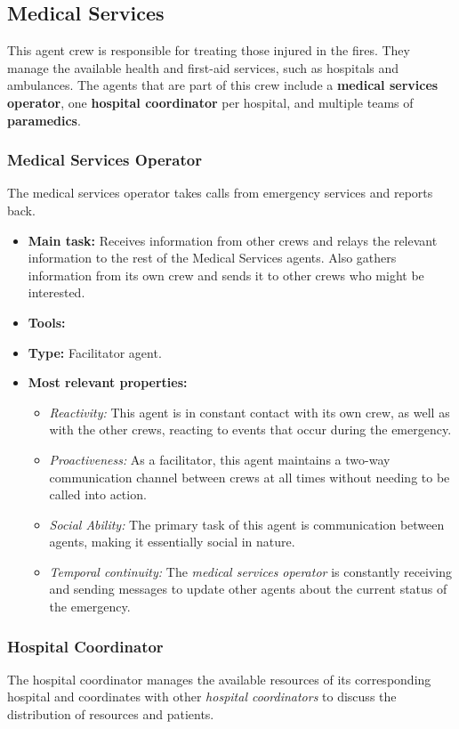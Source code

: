 \subsection{Medical Services}
This agent crew is responsible for treating those injured in the fires. 
They manage the available health and first-aid services, such as hospitals and ambulances. 
The agents that are part of this crew include a \textbf{medical services operator}, one \textbf{hospital coordinator} per hospital, and multiple teams of \textbf{paramedics}.

\subsubsection{Medical Services Operator}
The medical services operator takes calls from emergency services and reports back.

\begin{itemize}
    \item \textbf{Main task:} Receives information from other crews and relays the relevant information to the rest of the Medical Services agents. Also gathers information from its own crew and sends it to other crews who might be interested.
    \item \textbf{Tools:}
    \item \textbf{Type:} Facilitator agent.
    \item \textbf{Most relevant properties:}
    \begin{itemize}
        \item \textit{Reactivity:} This agent is in constant contact with its own crew, as well as with the other crews, reacting to events that occur during the emergency.
        \item \textit{Proactiveness:} As a facilitator, this agent maintains a two-way communication channel between crews at all times without needing to be called into action.
        \item \textit{Social Ability:} The primary task of this agent is communication between agents, making it essentially social in nature.
        \item \textit{Temporal continuity:} The \textit{medical services operator} is constantly receiving and sending messages to update other agents about the current status of the emergency.
    \end{itemize}
\end{itemize}

\subsubsection{Hospital Coordinator}
The hospital coordinator manages the available resources of its corresponding hospital and coordinates with other \textit{hospital coordinators} to discuss the distribution of resources and patients.

